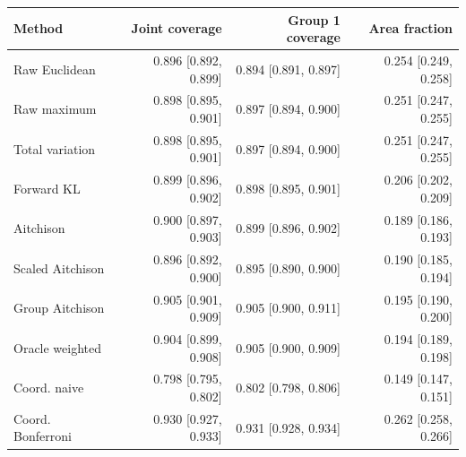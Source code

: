 \begin{tabular}{lrrr}
\toprule
Method & Joint coverage & Group 1 coverage & Area fraction \\
\midrule
Raw Euclidean & 0.896 [0.892, 0.899] & 0.894 [0.891, 0.897] & 0.254 [0.249, 0.258] \\
Raw maximum & 0.898 [0.895, 0.901] & 0.897 [0.894, 0.900] & 0.251 [0.247, 0.255] \\
Total variation & 0.898 [0.895, 0.901] & 0.897 [0.894, 0.900] & 0.251 [0.247, 0.255] \\
Forward KL & 0.899 [0.896, 0.902] & 0.898 [0.895, 0.901] & 0.206 [0.202, 0.209] \\
Aitchison & 0.900 [0.897, 0.903] & 0.899 [0.896, 0.902] & 0.189 [0.186, 0.193] \\
Scaled Aitchison & 0.896 [0.892, 0.900] & 0.895 [0.890, 0.900] & 0.190 [0.185, 0.194] \\
Group Aitchison & 0.905 [0.901, 0.909] & 0.905 [0.900, 0.911] & 0.195 [0.190, 0.200] \\
Oracle weighted & 0.904 [0.899, 0.908] & 0.905 [0.900, 0.909] & 0.194 [0.189, 0.198] \\
Coord. naive & 0.798 [0.795, 0.802] & 0.802 [0.798, 0.806] & 0.149 [0.147, 0.151] \\
Coord. Bonferroni & 0.930 [0.927, 0.933] & 0.931 [0.928, 0.934] & 0.262 [0.258, 0.266] \\
\bottomrule
\end{tabular}
